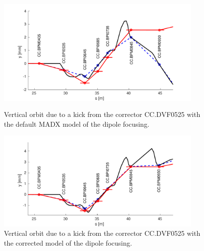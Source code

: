 \begin{figure}
  \centering
  \includegraphics[width=0.9\textwidth]{Figures/optics/modelOrigBendV}
  \caption{Vertical orbit due to a kick from the corrector CC.DVF0525 with the default MADX  model of the dipole focusing.}
  \label{f:modelOrigBendV}
  \includegraphics[width=0.9\textwidth]{Figures/optics/modelCorrBendV}
  \caption{Vertical orbit due to a kick from the corrector CC.DVF0525 with the corrected model of the dipole focusing.}
  \label{f:modelCorrBendV}
\end{figure}


